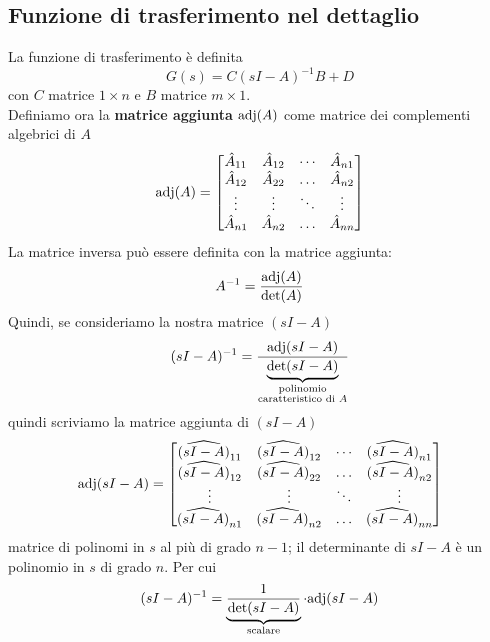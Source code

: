 \documentclass{article}
\numberwithin{equation}{subsection}
\let\oldsubsection\subsection%
\renewcommand{\subsection}{%
  \renewcommand{\theequation}{\thesubsection.\arabic{equation}}%
  \oldsubsection}%
\begin{document}
\subsection{Funzione di trasferimento nel dettaglio}
La funzione di trasferimento è definita
\[
    G(s) = C(sI-A)^{-1}B + D
\]
con $C$ matrice $1 \times n$ e $B$ matrice $m \times 1$.
\vspace*{0.2cm}\\
Definiamo ora la \textbf{matrice aggiunta} $\text{adj}(A)$ come matrice dei complementi algebrici di $A$
\begin{equation}
    \text{adj}(A) = 
    \begin{bmatrix}
        \hat A_{11} & \hat A_{12} & \cdots & \hat A_{n1} \\
        \hat A_{12} & \hat A_{22} & \dots & \hat A_{n2} \\
        \vdots & \vdots  & \ddots & \vdots\\
        \hat A_{n1} & \hat A_{n2} & \dots & \hat A_{nn}
    \end{bmatrix}
\end{equation}
La matrice inversa può essere definita con la matrice aggiunta:
\begin{equation}
    A^{-1} = \frac{\text{adj}(A)}{\det(A)}
\end{equation}
Quindi, se consideriamo la nostra matrice $(sI-A)$
\begin{equation}
    (sI-A)^{-1} = \frac{\text{adj}(sI-A)}{\underbrace{\det(sI-A)}_{\substack{\text{polinomio} \\ \text{caratteristico di } A}}}
\end{equation}
quindi scriviamo la matrice aggiunta di $(sI-A)$
\begin{equation}
    \text{adj}(sI-A) = 
    \begin{bmatrix}
        \widehat{(sI-A)}_{11} & \widehat{(sI-A)}_{12} & \cdots &  \widehat{(sI-A)}_{n1} \\
        \widehat{(sI-A)}_{12} & \widehat{(sI-A)}_{22} & \dots & \widehat{(sI-A)}_{n2} \\
        \vdots & \vdots  & \ddots & \vdots\\
        \widehat{(sI-A)}_{n1} & \widehat{(sI-A)}_{n2} & \dots & \widehat{(sI-A)}_{nn}
    \end{bmatrix}
\end{equation}
matrice di polinomi in $s$ al più di grado $n-1$; il determinante di $sI-A$ è un polinomio in $s$ di grado $n$. Per cui 
\begin{equation}
    (sI-A)^{-1} = \underbrace{\frac{1}{\det(sI-A)}}_{\text{scalare}} \cdot \text{adj}(sI-A)
\end{equation}
\end{document}
